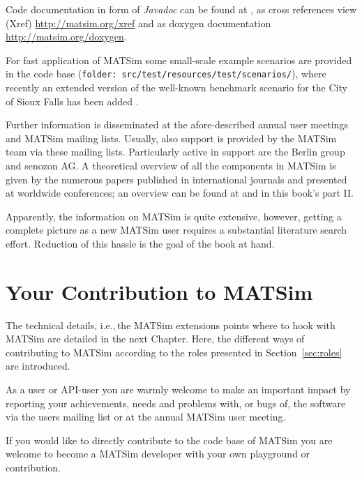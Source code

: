 Code documentation in form of \emph{Javadoc} can be found at \citet[][]{MATSIM-T-Javadoc_Webpage_2014}, as cross references view (Xref) \url{http://matsim.org/xref} and as doxygen documentation \url{http://matsim.org/doxygen}. %

For fast application of MATSim some small-scale example scenarios are provided in the code base (\lstinline|folder: src/test/resources/test/scenarios/|), where recently an extended version of the well-known benchmark scenario for the City of Sioux Falls has been added \citep[][]{ChakirovFourie_TechRep_FCL_2014}.

Further information is disseminated at the afore-described annual user meetings and MATSim mailing lists. Usually, also support is provided by the MATSim team via these mailing lists. Particularly active in support are the Berlin group and senozon AG. A theoretical overview of all the components in MATSim is given by the numerous papers published in international journals and presented at worldwide conferences; an overview can be found at \citep[][]{MATSIM-T-Publications_Webpage_2014} and in this book's part II.

Apparently, the information on MATSim is quite extensive, however, getting a complete picture as a new MATSim user requires a substantial literature search effort. Reduction of this hassle is the goal of the book at hand.

\section{Your Contribution to MATSim}
\label{sec:yourcontribution}
The technical details, i.e.,\,the MATSim extensions points where to hook with MATSim are detailed in the next Chapter. Here, the different ways of contributing to MATSim according to the roles presented in Section~\ref{sec:roles} are introduced.

As a user or API-user you are warmly welcome to make an important impact by reporting your achievements, needs and problems with, or bugs of, the software via the users mailing list or at the annual MATSim user meeting. 

If you would like to directly contribute to the code base of MATSim you are welcome to become a MATSim developer with your own playground or contribution.

